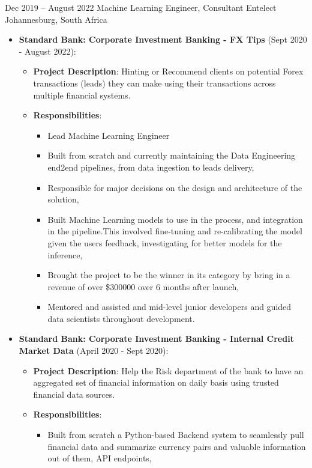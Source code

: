 \documentclass[11pt, letterpaper]{moderncv}        %
\begin{document}
\cventry
{Dec 2019 -- August 2022}
{Machine Learning Engineer, Consultant}
{Entelect}
{Johannesburg, South Africa}
{}
{\begin{itemize}%
		\item \textbf{Standard Bank: Corporate Investment Banking - FX Tips} (Sept 2020 - August 2022): 
		\begin{itemize}
			\item \textbf{Project Description}: Hinting or Recommend clients on potential Forex transactions (leads) they can make using their transactions across multiple financial systems. 
			\item \textbf{Responsibilities}:
			\begin{itemize}
				\item Lead Machine Learning Engineer
				\item Built from scratch and currently maintaining the Data Engineering end2end pipelines, from data ingestion to leads delivery,
				\item Responsible for major decisions on the design and architecture of the solution,
				\item Built Machine Learning models to use in the process, and integration in the pipeline.This involved fine-tuning and re-calibrating the model given the users feedback, investigating for better models for the inference,
				\item Brought the project to be the winner in its category by bring in a revenue of over \$300000 over 6 months after launch,
				\item Mentored and assisted and mid-level junior developers and guided data scientists throughout development. 
		\end{itemize}
		\end{itemize}
		\item \textbf{Standard Bank: Corporate Investment Banking - Internal Credit Market Data} (April 2020 - Sept 2020): 
		\begin{itemize}
			\item \textbf{Project Description}: Help the Risk department of the bank to have an aggregated set of financial information on daily basis using trusted financial data sources.
			\item \textbf{Responsibilities}:
			\begin{itemize}
				\item Built from scratch a Python-based Backend system to seamlessly pull financial data and summarize currency pairs and valuable information out of them, API endpoints,

\end{itemize}
\end{itemize}
\end{itemize}}
\end{document}
